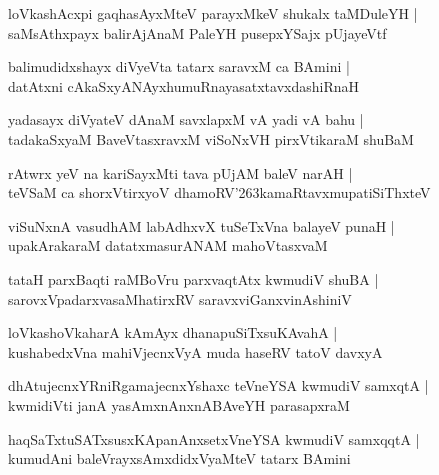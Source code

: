 \documentclass[twoside,12pt,openright]{book}
\def\S{\char'263}
\newcounter{shloka}[chapter]
\begin{document}
\begin{shloka}%
loVkashAcxpi gaqhasAyxMteV parayxMkeV shukalx taMDuleYH |\\
saMsAthxpayx balirAjAnaM PaleYH pusepxYSajx pUjayeVtf
\end{shloka}

\begin{shloka}%
balimudidxshayx diVyeVta tatarx saravxM ca BAmini |\\
datAtxni cAkaSxyANAyxhumuRnayasatxtavxdashiRnaH
\end{shloka}

\begin{shloka}%
yadasayx diVyateV dAnaM savxlapxM vA yadi vA bahu |\\
tadakaSxyaM BaveVtasxravxM viSoNxVH pirxVtikaraM shuBaM 
\end{shloka}

\begin{shloka}%
rAtwrx yeV na kariSayxMti tava pUjAM baleV narAH |\\
teVSaM ca shorxVtirxyoV dhamoRV\S kamaRtavxmupatiSiThxteV 
\end{shloka}

\begin{shloka}%
viSuNxnA vasudhAM labAdhxvX tuSeTxVna balayeV punaH |\\
upakArakaraM datatxmasurANAM mahoVtasxvaM 
\end{shloka}

\begin{shloka}%
tataH parxBaqti raMBoVru parxvaqtAtx kwmudiV shuBA |\\
sarovxVpadarxvasaMhatirxRV saravxviGanxvinAshiniV 
\end{shloka}

\begin{shloka}%
loVkashoVkaharA kAmAyx dhanapuSiTxsuKAvahA |\\
kushabedxVna mahiVjecnxVyA muda haseRV tatoV davxyA 
\end{shloka}

\begin{shloka}%
dhAtujecnxYRniRgamajecnxYshaxc teVneYSA kwmudiV samxqtA |\\
kwmidiVti janA yasAmxnAnxnABAveYH parasapxraM 
\end{shloka}

\begin{shloka}%
haqSaTxtuSATxsusxKApanAnxsetxVneYSA kwmudiV samxqqtA |\\
kumudAni baleVrayxsAmxdidxVyaMteV tatarx BAmini 
\end{shloka}
\end{document}
